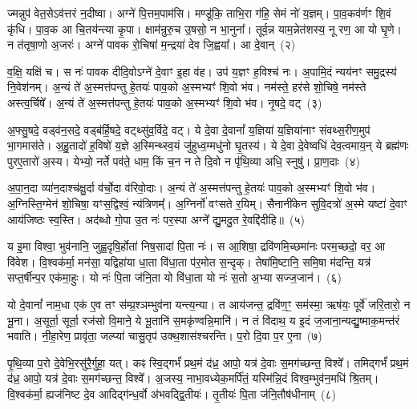 ज्मन्नुप॑ वेत॒से\-ऽव॑त्तरं न॒दीष्वा। अग्ने॑ पि॒त्तम॒पाम॑सि। मण्डू॑कि॒ ताभि॒रा ग॑हि॒ सेमं नो॑ य॒ज्ञम्। पा॒व॒कव॑र्णꣳ शि॒वं कृ॑धि। पा॒व॒क आ चि॒तय॑न्त्या कृ॒पा। क्षाम॑न्रुरु॒च उ॒षसो॒ न भा॒नुना᳚। तूर्व॒न्न याम॒न्नेत॑शस्य॒ नू रण॒ आ यो घृ॒णे। न त॑तृषा॒णो अ॒जरः॑। अग्ने॑ पावक रो॒चिषा॑ म॒न्द्रया॑ देव जि॒ह्वया᳚। आ दे॒वान्~(२)

व॒क्षि॒ यक्षि॑ च। स नः॑ पावक दीदि॒वो\-ऽग्ने॑ दे॒वाꣳ इ॒हा व॑ह। उप॑ य॒ज्ञꣳ ह॒विश्च॑ नः। अ॒पामि॒दं न्यय॑नꣳ समु॒द्रस्य॑ नि॒वेश॑नम्। अ॒न्यं ते॑ अ॒स्मत्त॑पन्तु हे॒तयः॑ पाव॒को अ॒स्मभ्यꣳ॑ शि॒वो भ॑व। नम॑स्ते॒ हर॑से शो॒चिषे॒ नम॑स्ते अस्त्व॒र्चिषे᳚। अ॒न्यं ते॑ अ॒स्मत्त॑पन्तु हे॒तयः॑ पाव॒को अ॒स्मभ्यꣳ॑ शि॒वो भ॑व। नृ॒षदे॒ वट्~(३)

अ॒फ्सु॒षदे॒ वड्व॑न॒सदे॒ वड्ब॑र्\mbox{}हि॒षदे॒ वट्थ्सु॑व॒र्विदे॒ वट्। ये दे॒वा दे॒वानां᳚ य॒ज्ञिया॑ य॒ज्ञिया॑नाꣳ संवथ्स॒रीण॒मुप॑ भा॒गमास॑ते। अ॒हु॒तादो॑ ह॒विषो॑ य॒ज्ञे अ॒स्मिन्थ्स्व॒यं जु॑हुध्व॒म्मधु॑नो घृ॒तस्य॑। ये दे॒वा दे॒वेष्वधि॑ देव॒त्वमाय॒न् ये ब्रह्म॑णः पुरए॒तारो॑ अ॒स्य। येभ्यो॒ नर्ते पव॑ते॒ धाम॒ किं च॒न न ते दि॒वो न पृ॑थि॒व्या अधि॒ स्नुषु॑। प्रा॒ण॒दाः~(४)

अ॒पा॒न॒दा व्या॑न॒दाश्च॑क्षु॒र्दा व॑र्चो॒दा व॑रिवो॒दाः। अ॒न्यं ते॑ अ॒स्मत्त॑पन्तु हे॒तयः॑ पाव॒को अ॒स्मभ्यꣳ॑ शि॒वो भ॑व। अ॒ग्निस्ति॒ग्मेन॑ शो॒चिषा॒ यꣳस॒द्विश्वं॒ न्य॑त्रिणम्᳚। अ॒ग्निर्नो॑ वꣳसते र॒यिम्। सैनानी॑केन सुवि॒दत्रो॑ अ॒स्मे यष्टा॑ दे॒वाꣳ आय॑जिष्ठः स्व॒स्ति। अद॑ब्धो गो॒पा उ॒त नः॑ पर॒स्पा अग्ने᳚ द्यु॒मदु॒त रे॒वद्दि॑दीहि॥~(५)

{\anuvakamend[{उप॑ दे॒वान् वट्प्रा॑ण॒दाश्चतु॑श्चत्वारिꣳशच्च}]}%

य इ॒मा विश्वा॒ भुव॑नानि॒ जुह्व॒दृषि॒र्\mbox{}होता॑ निष॒सादा॑ पि॒ता नः॑। स आ॒शिषा॒ द्रवि॑णमि॒च्छमा॑नः परम॒च्छदो॒ वर॒ आ वि॑वेश। वि॒श्वक॑र्मा॒ मन॑सा॒ यद्विहा॑या धा॒ता वि॑धा॒ता प॑र॒मोत स॒न्दृक्। तेषा॑मि॒ष्टानि॒ समि॒षा म॑दन्ति॒ यत्र॑ सप्त॒र्\mbox{}षीन्प॒र एक॑मा॒हुः। यो नः॑ पि॒ता ज॑नि॒ता यो वि॑धा॒ता यो नः॑ स॒तो अ॒भ्या सज्ज॒जान॑।~(६)

यो दे॒वानां᳚ नाम॒धा एक॑ ए॒व तꣳ स॑म्प्र॒श्ञम्भुव॑ना यन्त्य॒न्या। त आय॑जन्त॒ द्रवि॑ण॒ꣳ॒ सम॑स्मा॒ ऋष॑यः॒ पूर्वे॑ जरि॒तारो॒ न भू॒ना। अ॒सूर्ता॒ सूर्ता॒ रज॑सो वि॒माने॒ ये भू॒तानि॑ स॒मकृ॑ण्वन्नि॒मानि॑। न तं वि॑दाथ॒ य इ॒दं ज॒जाना॒न्यद्यु॒ष्माक॒मन्त॑रं भवाति। नी॒हा॒रेण॒ प्रावृ॑ता॒ जल्प्या॑ चासु॒तृप॑ उक्थ॒शास॑श्चरन्ति। प॒रो दि॒वा प॒र ए॒ना~(७)

पृ॒थि॒व्या प॒रो दे॒वेभि॒रसु॑रै॒र्गुहा॒ यत्। कꣴ स्वि॒द्गर्भं॑ प्रथ॒मं द॑ध्र॒ आपो॒ यत्र॑ दे॒वाः स॒मग॑च्छन्त॒ विश्वे᳚। तमिद्गर्भं॑ प्रथ॒मं द॑ध्र॒ आपो॒ यत्र॑ दे॒वाः स॒मग॑च्छन्त॒ विश्वे᳚। अ॒जस्य॒ नाभा॒वध्येक॒मर्पि॑तं॒ यस्मि॑न्नि॒दं विश्व॒म्भुव॑न॒\-मधि॑ श्रि॒तम्। वि॒श्वक॑र्मा॒ ह्यज॑निष्ट दे॒व आदिद्ग॑न्ध॒र्वो अ॑भवद्द्वि॒तीयः॑। तृ॒तीयः॑ पि॒ता ज॑नि॒तौष॑धीनाम्~(८)

